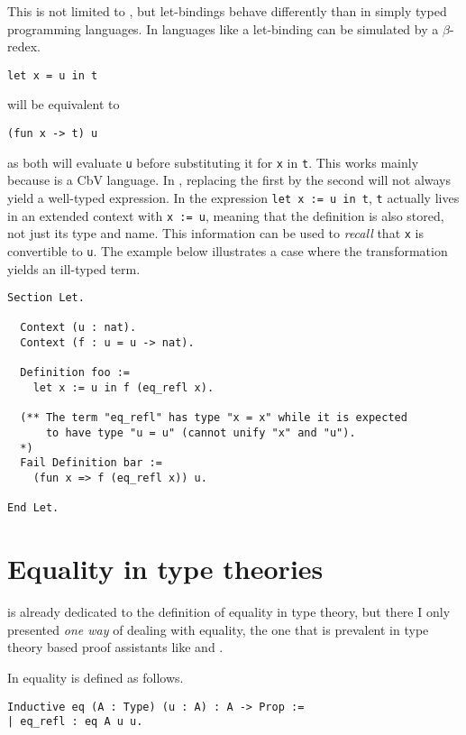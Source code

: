 This is not limited to \Coq, but let-bindings behave differently than in
simply typed programming languages. In languages like \ocaml a let-binding can
be simulated by a \(\beta\)-redex.
\begin{verbatim}
let x = u in t
\end{verbatim}
will be equivalent to
\begin{verbatim}
(fun x -> t) u
\end{verbatim}
as both will evaluate \texttt{u} before substituting it for
\texttt{x} in \texttt{t}. This works mainly because
\ocaml is a \acrshort{CbV} language.
In \Coq, replacing the first by the second will not always yield a well-typed
expression.
In the \Coq expression \texttt{let x := u in t}, \texttt{t}
actually lives in an extended context with \texttt{x := u}, meaning
that the definition is also stored, not just its type and name. This information
can be used to \emph{recall} that \texttt{x} is convertible to
\texttt{u}. The example below illustrates a case where the
transformation yields an ill-typed term.
\begin{verbatim}
Section Let.

  Context (u : nat).
  Context (f : u = u -> nat).

  Definition foo :=
    let x := u in f (eq_refl x).

  (** The term "eq_refl" has type "x = x" while it is expected
      to have type "u = u" (cannot unify "x" and "u").
  *)
  Fail Definition bar :=
    (fun x => f (eq_refl x)) u.

End Let.
\end{verbatim}

\section{Equality in type theories}

 is already dedicated to the definition of equality in
type theory, but there I only presented \emph{one way} of dealing with equality,
the one that is prevalent in type theory based proof assistants like \Agda and
\Coq.

In \Coq equality is defined as follows.
\begin{verbatim}
Inductive eq (A : Type) (u : A) : A -> Prop :=
| eq_refl : eq A u u.
\end{verbatim}

